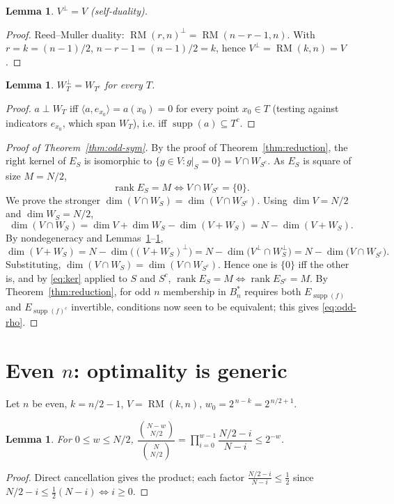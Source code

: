 \documentclass{amsart}
\newtheorem{lemma}[theorem]{Lemma}
\theoremstyle{definition}
\DeclareMathOperator{\supp}{supp}
\DeclareMathOperator{\RM}{RM}
\DeclareMathOperator{\rank}{rank}
\begin{document}
\begin{lemma}\label{lem:selfdual}
$V^{\perp}=V$ (self-duality).
\end{lemma}
\begin{proof}
Reed--Muller duality: $\RM(r,n)^{\perp}=\RM(n-r-1,n)$. With $r=k=(n-1)/2$,
$n-r-1=(n-1)/2=k$, hence $V^{\perp}=\RM(k,n)=V$.
\end{proof}

\begin{lemma}\label{lem:WTdual}
$W_T^{\perp}=W_{T^c}$ for every $T$.
\end{lemma}
\begin{proof}
$a\perp W_T$ iff $\langle a,e_{x_0}\rangle=a(x_0)=0$ for every point
$x_0\in T$ (testing against indicators $e_{x_0}$, which span $W_T$), i.e.
iff $\supp(a)\subseteq T^c$.
\end{proof}

\begin{proof}[Proof of Theorem~\ref{thm:odd-sym}]
By the proof of Theorem~\ref{thm:reduction}, the right kernel of $E_S$ is
isomorphic to $\{g\in V:g|_S=0\}=V\cap W_{S^c}$. As $E_S$ is square of size
$M=N/2$,
\begin{equation}\label{eq:ker}
\rank E_S=M\iff V\cap W_{S^c}=\{0\}.
\end{equation}
We prove the stronger
$\dim(V\cap W_S)=\dim(V\cap W_{S^c})$. Using $\dim V=N/2$ and
$\dim W_S=N/2$,
\[
\dim(V\cap W_S)=\dim V+\dim W_S-\dim(V+W_S)=N-\dim(V+W_S).
\]
By nondegeneracy and Lemmas~\ref{lem:selfdual}--\ref{lem:WTdual},
\[
\dim(V+W_S)=N-\dim\bigl((V+W_S)^{\perp}\bigr)
=N-\dim\bigl(V^{\perp}\cap W_S^{\perp}\bigr)
=N-\dim\bigl(V\cap W_{S^c}\bigr).
\]
Substituting, $\dim(V\cap W_S)=\dim(V\cap W_{S^c})$. Hence one is $\{0\}$
iff the other is, and by \eqref{eq:ker} applied to $S$ and $S^c$,
$\rank E_S=M\iff\rank E_{S^c}=M$. By Theorem~\ref{thm:reduction}, for odd
$n$ membership in $B_n^*$ requires both $E_{\supp(f)}$ and
$E_{\supp(f)^c}$ invertible, conditions now seen to be equivalent; this
gives \eqref{eq:odd-rho}.
\end{proof}

\section{Even $n$: optimality is generic}\label{sec:even}

Let $n$ be even, $k=n/2-1$, $V=\RM(k,n)$, $w_0=2^{\,n-k}=2^{\,n/2+1}$.

\begin{lemma}\label{lem:ratio}
For $0\le w\le N/2$,
$\dfrac{\binom{N-w}{N/2}}{\binom{N}{N/2}}
=\prod_{i=0}^{w-1}\dfrac{N/2-i}{N-i}\le 2^{-w}$.
\end{lemma}
\begin{proof}
Direct cancellation gives the product; each factor
$\frac{N/2-i}{N-i}\le\frac12$ since $N/2-i\le\frac12(N-i)\iff i\ge0$.
\end{proof}
\end{document}

